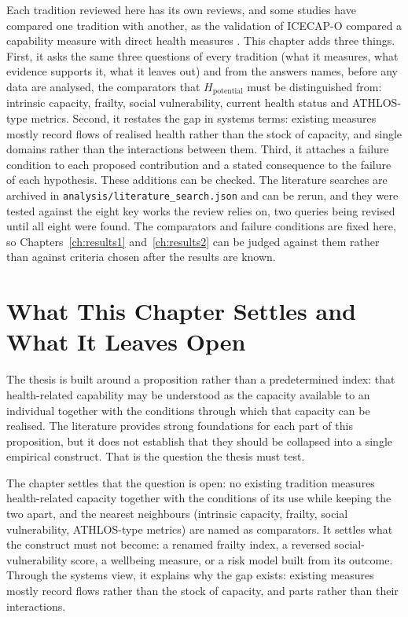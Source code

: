 Each tradition reviewed here has its own reviews, and some studies have compared one tradition with another, as the validation of ICECAP-O compared a capability measure with direct health measures \citep{icecap_o_validation}. This chapter adds three things. First, it asks the same three questions of every tradition (what it measures, what evidence supports it, what it leaves out) and from the answers names, before any data are analysed, the comparators that $H_{\text{potential}}$ must be distinguished from: intrinsic capacity, frailty, social vulnerability, current health status and ATHLOS-type metrics. Second, it restates the gap in systems terms: existing measures mostly record flows of realised health rather than the stock of capacity, and single domains rather than the interactions between them. Third, it attaches a failure condition to each proposed contribution and a stated consequence to the failure of each hypothesis. These additions can be checked. The literature searches are archived in \texttt{analysis/literature\_search.json} and can be rerun, and they were tested against the eight key works the review relies on, two queries being revised until all eight were found. The comparators and failure conditions are fixed here, so Chapters~\ref{ch:results1} and~\ref{ch:results2} can be judged against them rather than against criteria chosen after the results are known.

\section{What This Chapter Settles and What It Leaves Open}

The thesis is built around a proposition rather than a predetermined index: that health-related capability may be understood as the capacity available to an individual together with the conditions through which that capacity can be realised. The literature provides strong foundations for each part of this proposition, but it does not establish that they should be collapsed into a single empirical construct. That is the question the thesis must test.

The chapter settles that the question is open: no existing tradition measures health-related capacity together with the conditions of its use while keeping the two apart, and the nearest neighbours (intrinsic capacity, frailty, social vulnerability, ATHLOS-type metrics) are named as comparators. It settles what the construct must not become: a renamed frailty index, a reversed social-vulnerability score, a wellbeing measure, or a risk model built from its outcome. Through the systems view, it explains why the gap exists: existing measures mostly record flows rather than the stock of capacity, and parts rather than their interactions.

